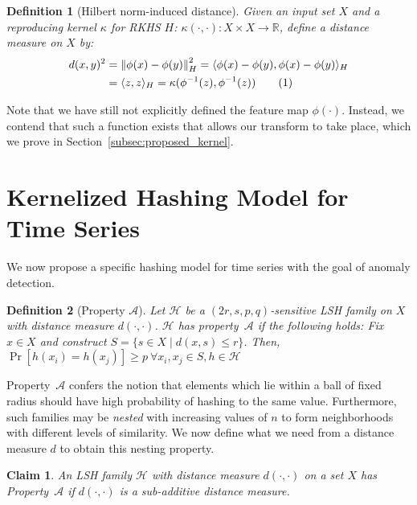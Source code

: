 \documentclass[a4paper]{article}
\newcommand\numberthis{\addtocounter{equation}{1}\tag{\theequation}}
\newcommand{\norm}[1]{\left\lVert#1\right\rVert}
\newcommand{\innerproduct}[2]{\langle{}#1,#2\rangle{}}
\theoremstyle{def}
\newtheorem{definition}{Definition}
\theoremstyle{thm}
\newtheorem{claim}[proposition]{Claim}
\newcommand{\R}[0]{\mathbb{R}}
\newcommand{\LSH}[0]{\mathcal{H}}
\begin{document}
\begin{definition}[Hilbert norm-induced distance]\label{defn:norm_distance}
    Given an input set $X$ and a reproducing kernel $\kappa$ for RKHS $H$: $\kappa(\cdot, \cdot) \colon X \times X \rightarrow \R$, define a distance measure on $X$ by:
    \begin{align*}
        d(x,y)^2 &= \norm{\phi(x) - \phi(y)}_H^2 = \innerproduct{\phi(x) - \phi(y)}{\phi(x) - \phi(y)}_H \\
        &= \innerproduct{z}{z}_H = \kappa(\phi^{-1}(z), \phi^{-1}(z)) \numberthis
    \end{align*}
\end{definition}

Note that we have still not explicitly defined the feature map $\phi(\cdot)$.
Instead, we contend that such a function exists that allows our transform to take place, which we prove in Section~\ref{subsec:proposed_kernel}.

\section{Kernelized Hashing Model for Time Series}
\label{sec:kernel_hashing}

We now propose a specific hashing model for time series with the goal of anomaly detection.

\begin{definition}[Property $\mathscr{A}$]\label{defn:property_alpha}
    Let $\LSH$ be a $(2r, s, p, q)$-sensitive LSH family on $X$ with distance measure $d(\cdot, \cdot)$.
    $\LSH$ has property~$\mathscr{A}$ if the following holds:
    Fix $x \in X$ and construct $S = \{s \in X \mid d(x,s) \le r\}$.
    Then, $\Pr[h(x_i) = h(x_j)] \ge p~\forall x_i, x_j \in S, h \in \LSH$ 
\end{definition}

Property~$\mathscr{A}$ confers the notion that elements which lie within a ball of fixed radius should have high probability of hashing to the same value.
Furthermore, such families may be \textit{nested} with increasing values of $n$ to form neighborhoods with different levels of similarity.
We now define what we need from a distance measure $d$ to obtain this nesting property.

\begin{claim}\label{prop:property_alpha}
    An LSH family $\LSH$ with distance measure $d(\cdot, \cdot)$ on a set $X$ has Property~$\mathscr{A}$ if $d(\cdot, \cdot)$ is a sub-additive distance measure.
\end{claim}
\end{document}
